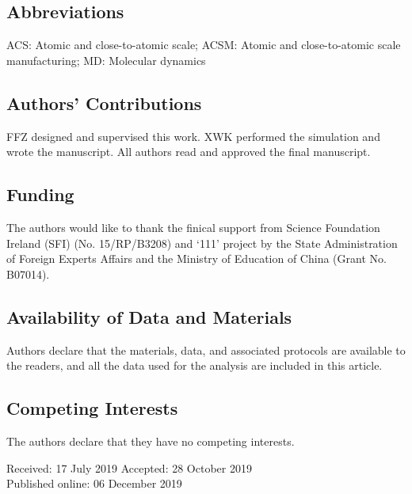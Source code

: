 \documentclass{article}
\begin{document}
\subsection*{Abbreviations}
ACS: Atomic and close-to-atomic scale; ACSM: Atomic and close-to-atomic scale manufacturing; MD: Molecular dynamics

\subsection*{Authors’ Contributions}
FFZ designed and supervised this work. XWK performed the simulation and wrote the manuscript. All authors read and approved the final manuscript.

\subsection*{Funding}
The authors would like to thank the finical support from Science Foundation Ireland (SFI) (No. 15/RP/B3208) and ‘111’ project by the State Administration of Foreign Experts Affairs and the Ministry of Education of China (Grant No. B07014).

\subsection*{Availability of Data and Materials}
Authors declare that the materials, data, and associated protocols are available to the readers, and all the data used for the analysis are included in this article.

\subsection*{Competing Interests}
The authors declare that they have no competing interests.

\noindent Received: 17 July 2019 Accepted: 28 October 2019\\
Published online: 06 December 2019
\end{document}
